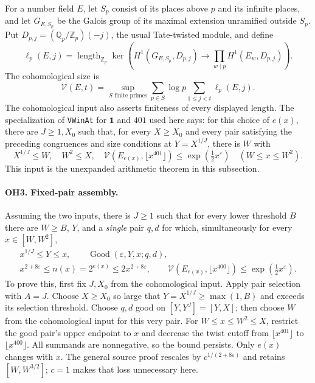 \documentclass[11pt,a4paper]{article}
\numberwithin{equation}{section}
\theoremstyle{remark}\newtheorem{remark}[theorem]{Remark}
\begin{document}
For a number field $E$, let $S_p$ consist of its places above $p$ and its
infinite places, and let $G_{E,S_p}$ be the Galois group of its maximal
extension unramified outside $S_p$. Put
$D_{p,j}=(\mathbb Q_p/\mathbb Z_p)(-j)$, the usual Tate-twisted module, and define
\[
\ell_p(E,j)=\operatorname{length}_{\mathbb Z_p}\ker\left(
H^1(G_{E,S_p},D_{p,j})\longrightarrow\prod_{w\mid p}H^1(E_w,D_{p,j})\right).
\]
The cohomological size is
\[
 \mathcal V(E,t)=\sup_{S\text{ finite primes}}
       \sum_{p\in S}\log p\sum_{1\le j<t}\ell_p(E,j).
\]
The cohomological input also asserts finiteness of every displayed length.
The specialization of \texttt{VWinAt} for $\mathbf1$ and $401$ used here says:
for this choice of $e(x)$, there are $J\ge1,X_0$ such that, for every
$X\ge X_0$ and every pair satisfying the preceding congruences and size
conditions at $Y=X^{1/J}$, there is $W$ with
\[
 X^{1/J}\le W,\quad W^2\le X,\quad
 \mathcal V(E_{e(x)},\lfloor x^{401}\rfloor)
       \le \exp(\tfrac12x^\varepsilon)\quad(W\le x\le W^2).
\]
This input is the unexpanded arithmetic theorem in this subsection.

\paragraph{OH3. Fixed-pair assembly.}
Assuming the two inputs, there is $J\ge1$ such that for every lower
threshold $B$ there are $W\ge B$, $Y$, and a \emph{single} pair $q,d$ for
which, simultaneously for every $x\in[W,W^2]$,
\[
 \begin{gathered}
 x^{1/J}\le Y\le x,\qquad \operatorname{Good}(\varepsilon,Y,x;q,d),\\
 x^{2+8\varepsilon}\le n(x)=2^{e(x)}\le2x^{2+8\varepsilon},\qquad
 \mathcal V(E_{e(x)},\lfloor x^{400}\rfloor)
       \le\exp(\tfrac12x^\varepsilon).
 \end{gathered}
\]
To prove this, first fix $J,X_0$ from the cohomological input.  Apply pair
selection with $A=J$.  Choose $X\ge X_0$ so large that
$Y=X^{1/J}\ge\max(1,B)$ and exceeds its selection threshold.  Choose
$q,d$ good on $[Y,Y^J]=[Y,X]$; then choose $W$ from the cohomological
input for this very pair.  For $W\le x\le W^2\le X$, restrict the good
pair's upper endpoint to $x$ and decrease the twist cutoff from
$\lfloor x^{401}\rfloor$ to $\lfloor x^{400}\rfloor$.
All summands are nonnegative, so the bound persists.  Only $e(x)$ changes
with $x$.  The general source proof rescales by $c^{1/(2+8\varepsilon)}$
and retains $[W,W^{3/2}]$; $c=1$ makes that loss unnecessary here.
\end{document}
